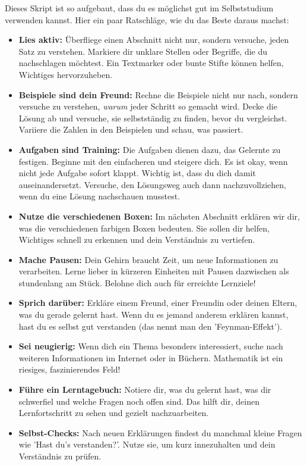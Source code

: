 Dieses Skript ist so aufgebaut, dass du es möglichst gut im Selbststudium verwenden kannst. Hier ein paar Ratschläge, wie du das Beste daraus machst:
\begin{itemize}
    \item \textbf{Lies aktiv:} Überfliege einen Abschnitt nicht nur, sondern versuche, jeden Satz zu verstehen. Markiere dir unklare Stellen oder Begriffe, die du nachschlagen möchtest. Ein Textmarker oder bunte Stifte können helfen, Wichtiges hervorzuheben.
    \item \textbf{Beispiele sind dein Freund:} Rechne die Beispiele nicht nur nach, sondern versuche zu verstehen, \textit{warum} jeder Schritt so gemacht wird. Decke die Lösung ab und versuche, sie selbstständig zu finden, bevor du vergleichst. Variiere die Zahlen in den Beispielen und schau, was passiert.
    \item \textbf{Aufgaben sind Training:} Die Aufgaben dienen dazu, das Gelernte zu festigen. Beginne mit den einfacheren und steigere dich. Es ist okay, wenn nicht jede Aufgabe sofort klappt. Wichtig ist, dass du dich damit auseinandersetzt. Versuche, den Lösungsweg auch dann nachzuvollziehen, wenn du eine Lösung nachschauen musstest.
    \item \textbf{Nutze die verschiedenen Boxen:} Im nächsten Abschnitt erklären wir dir, was die verschiedenen farbigen Boxen bedeuten. Sie sollen dir helfen, Wichtiges schnell zu erkennen und dein Verständnis zu vertiefen.
    \item \textbf{Mache Pausen:} Dein Gehirn braucht Zeit, um neue Informationen zu verarbeiten. Lerne lieber in kürzeren Einheiten mit Pausen dazwischen als stundenlang am Stück. Belohne dich auch für erreichte Lernziele!
    \item \textbf{Sprich darüber:} Erkläre einem Freund, einer Freundin oder deinen Eltern, was du gerade gelernt hast. Wenn du es jemand anderem erklären kannst, hast du es selbst gut verstanden (das nennt man den 'Feynman-Effekt').
    \item \textbf{Sei neugierig:} Wenn dich ein Thema besonders interessiert, suche nach weiteren Informationen im Internet oder in Büchern. Mathematik ist ein riesiges, faszinierendes Feld!
    \item \textbf{Führe ein Lerntagebuch:} Notiere dir, was du gelernt hast, was dir schwerfiel und welche Fragen noch offen sind. Das hilft dir, deinen Lernfortschritt zu sehen und gezielt nachzuarbeiten.
    \item \textbf{Selbst-Checks:} Nach neuen Erklärungen findest du manchmal kleine Fragen wie 'Hast du's verstanden?'. Nutze sie, um kurz innezuhalten und dein Verständnis zu prüfen.
\end{itemize}

